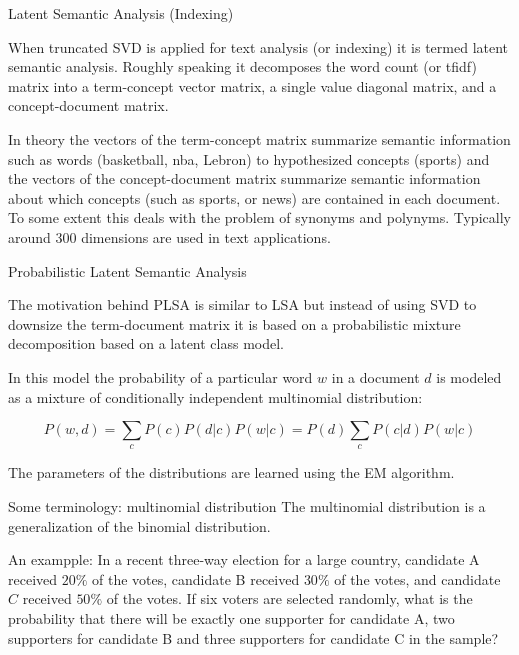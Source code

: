 \documentclass[12pt]{beamer}
\begin{document}
\begin{frame}{Latent Semantic Analysis (Indexing)} 

When truncated SVD is applied for text analysis (or indexing) it is
termed latent semantic analysis. Roughly speaking it decomposes the
word count (or tfidf) matrix into a term-concept vector matrix, a
single value diagonal matrix, and a concept-document matrix.

In theory the vectors of the term-concept matrix summarize semantic
information such as words (basketball, nba, Lebron) to hypothesized
concepts (sports) and the vectors of the concept-document matrix
summarize semantic information about which concepts (such as sports,
or news) are contained in each document. To some extent this deals
with the problem of synonyms and polynyms. Typically around 300
dimensions are used in text applications. 

\end{frame} 




\begin{frame}{Probabilistic Latent Semantic Analysis} 

The motivation behind PLSA is similar to LSA but instead of using SVD
to downsize the term-document matrix it is based on a probabilistic
mixture decomposition based on a latent class model.

In this model the probability of a particular word $w$ in a document
$d$ is modeled as a mixture of conditionally independent multinomial
distribution: 

\[
P(w,d) = \sum_c P(c) P(d|c) P(w|c) = P(d) \sum_c P(c|d) P(w|c)
\]

The parameters of the distributions are learned using the EM algorithm. 

\end{frame} 

\begin{frame}{Some terminology: multinomial distribution} 
The multinomial distribution is a generalization of the binomial distribution. 

An exampple: In a recent three-way election for a large country,
candidate A received $20\%$ of the votes, candidate B received $30\%$
of the votes, and candidate $C$ received $50\%$ of the votes. If six
voters are selected randomly, what is the probability that there will
be exactly one supporter for candidate A, two supporters for candidate
B and three supporters for candidate C in the sample?
\end{frame} 
\end{document}
